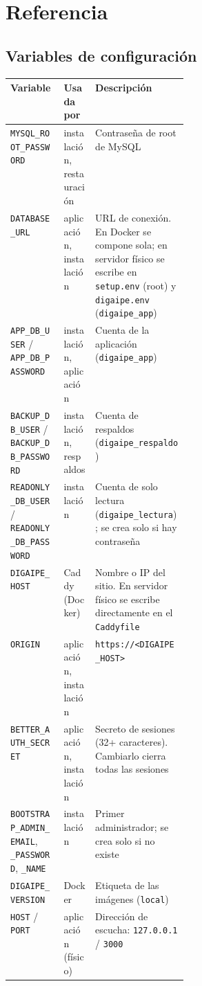 \chapter{Referencia}

\section{Variables de configuración}
\label{ap:variables}

\begin{xltabular}{\linewidth}{@{}>{\raggedright\arraybackslash}p{0.3\linewidth} l L@{}}
	\toprule
	\textbf{Variable} & \textbf{Usada por} & \textbf{Descripción} \\
	\midrule
	\endhead
	\texttt{MYSQL\_ROOT\_PASSWORD} & instalación, restauración & Contraseña de root de MySQL \\
	\texttt{DATABASE\_URL} & aplicación, instalación & URL de conexión. En Docker se compone sola;
	en servidor físico se escribe en \texttt{setup.env} (root) y \texttt{digaipe.env}
	(\texttt{digaipe\_app}) \\
	\texttt{APP\_DB\_USER} / \texttt{APP\_DB\_PASSWORD} & instalación, aplicación & Cuenta de la
	aplicación (\texttt{digaipe\_app}) \\
	\texttt{BACKUP\_DB\_USER} / \texttt{BACKUP\_DB\_PASSWORD} & instalación, respaldos & Cuenta de
	respaldos (\texttt{digaipe\_respaldo}) \\
	\texttt{READONLY\_DB\_USER} / \texttt{READONLY\_DB\_PASSWORD} & instalación & Cuenta de solo
	lectura (\texttt{digaipe\_lectura}); se crea solo si hay contraseña \\
	\texttt{DIGAIPE\_HOST} & Caddy (Docker) & Nombre o IP del sitio. En servidor físico se escribe
	directamente en el \texttt{Caddyfile} \\
	\texttt{ORIGIN} & aplicación, instalación & \texttt{https://<DIGAIPE\_HOST>} \\
	\texttt{BETTER\_AUTH\_SECRET} & aplicación, instalación & Secreto de sesiones (32+
	caracteres). Cambiarlo cierra todas las sesiones \\
	\texttt{BOOTSTRAP\_ADMIN\_EMAIL}, \texttt{\_PASSWORD}, \texttt{\_NAME} & instalación & Primer
	administrador; se crea solo si no existe \\
	\texttt{DIGAIPE\_VERSION} & Docker & Etiqueta de las imágenes (\texttt{local}) \\
	\texttt{HOST} / \texttt{PORT} & aplicación (físico) & Dirección de escucha:
	\texttt{127.0.0.1} / \texttt{3000} \\

\end{xltabular}
